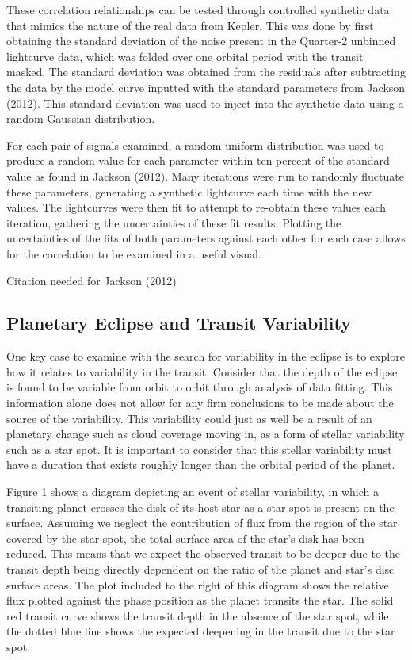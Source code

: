 \documentclass[manuscript]{aastex}
\begin{document}
	These correlation relationships can be tested through controlled synthetic data that mimics the nature of the real data from Kepler. This was done by first obtaining the standard deviation of the noise present in the Quarter-2 unbinned lightcurve data, which was folded over one orbital period with the transit masked. The standard deviation was obtained from the residuals after subtracting the data by the model curve inputted with the standard parameters from Jackson (2012). This standard deviation was used to inject into the synthetic data using a random Gaussian distribution.
    
    For each pair of signals examined, a random uniform distribution was used to produce a random value for each parameter within ten percent of the standard value as found in Jackson (2012). Many iterations were run to randomly fluctuate these parameters, generating a synthetic lightcurve each time with the new values. The lightcurves were then fit to attempt to re-obtain these values each iteration, gathering the uncertainties of these fit results. Plotting the uncertainties of the fits of both parameters against each other for each case allows for the correlation to be examined in a useful visual. 

Citation needed for Jackson (2012)

\subsection{Planetary Eclipse and Transit Variability} 

	One key case to examine with the search for variability in the eclipse is to explore how it relates to variability in the transit. Consider that the depth of the eclipse is found to be variable from orbit to orbit through analysis of data fitting. This information alone does not allow for any firm conclusions to be made about the source of the variability. This variability could just as well be a result of an planetary change such as cloud coverage moving in, as a form of stellar variability such as a star spot. It is important to consider that this stellar variability must have a duration that exists roughly longer than the orbital period of the planet.

	Figure 1 shows a diagram depicting an event of stellar variability, in which a transiting planet crosses the disk of its host star as a star spot is present on the surface. Assuming we neglect the contribution of flux from the region of the star covered by the star spot, the total surface area of the star's disk has been reduced. This means that we expect the observed transit to be deeper due to the transit depth being directly dependent on the ratio of the planet and star's disc surface areas. The plot included to the right of this diagram shows the relative flux plotted against the phase position as the planet transits the star. The solid red transit curve shows the transit depth in the absence of the star spot, while the dotted blue line shows the expected deepening in the transit due to the star spot.
    
\end{document}
